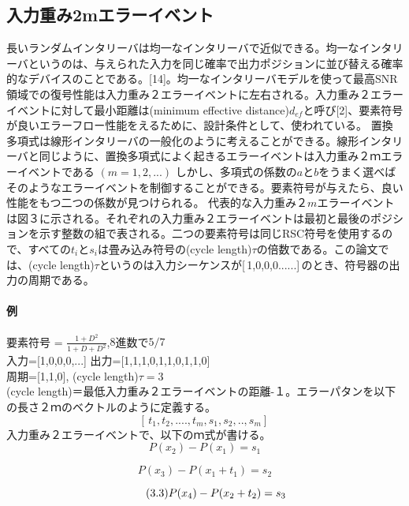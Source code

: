 \documentclass[20 pts]{article}
\begin{document}
\subsection{入力重み2mエラーイベント}
長いランダムインタリーバは均一なインタリーバで近似できる。均一なインタリーバというのは、与えられた入力を同じ確率で出力ポジションに並び替える確率的なデバイスのことである。[14]。均一なインタリーバモデルを使って最高SNR領域での復号性能は入力重み２エラーイベントに左右される。入力重み２エラーイベントに対して最小距離は(minimum effective distance)$d_{ef}$と呼び[2]、要素符号が良いエラーフロー性能をえるために、設計条件として、使われている。
置換多項式は線形インタリーバの一般化のように考えることができる。線形インタリーバと同じように、置換多項式によく起きるエラーイベントは入力重み$２ｍ$エラーイベントである $(m=1,2,...)$
しかし、多項式の係数の$a$と$b$をうまく選べばそのようなエラーイベントを制御することができる。要素符号が与えたら、良い性能をもつ二つの係数が見つけられる。
代表的な入力重み$２m$エラーイベントは図３に示される。それぞれの入力重み$２$エラーイベントは最初と最後のポジションを示す整数の組で表される。二つの要素符号は同じRSC符号を使用するので、すべての$t_i$と$s_i$は畳み込み符号の(cycle length)$\tau$の倍数である。この論文では、(cycle length)$\tau$というのは入力シーケンスが[\,1,0,0,0......]\,のとき、符号器の出力の周期である。
\paragraph{例}
要素符号 = $\frac{1+D^2}{1+D+D^2}$,$8$進数で$5/7$\\
入力=[1,0,0,0,...] 出力=[1,1,1,0,1,1,0,1,1,0]\\
周期=[1,1,0], (cycle length)$\tau=3$\\
 (cycle length)＝最低入力重み２エラーイベントの距離-１。エラーパタンを以下の長さ２ｍのベクトルのように定義する。
$$[\,t_1, t_2,...., t_m, s_1,s_2,.., s_m]\,$$
入力重み２エラーイベントで、以下のｍ式が書ける。
\begin{equation}\tag{3.1}
P(x_2)-P(x_1)=s_1
\end{equation}

\begin{equation}\tag{3.2}
P(x_3)-P(x_1+t_1)=s_2
\end{equation}

\begin{equation}\tag{3.3}
P(x_4)-P(x_2+t_2)=s_3\\
\end{equation}
\end{document}
